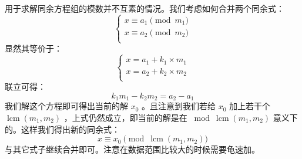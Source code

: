 用于求解同余方程组的模数并不互素的情况。我们考虑如何合并两个同余式：
$$
\begin{cases}
	x \equiv a_1 \pmod {m_1}\\
	x \equiv a_2 \pmod {m_2}\\
\end{cases}
$$
显然其等价于：
$$
\begin{cases}
	x = a_1 + k_1\times m_1\\
	x = a_2 + k_2\times m_2\\
\end{cases}
$$
联立可得：
$$
k_1m_1-k_2m_2=a_2-a_1
$$
我们解这个方程即可得出当前的解 $x_0$ 。且注意到我们若给 $x_0$ 加上若干个 $\operatorname{lcm}(m_1,m_2)$ ，上式仍然成立，即当前的解是在 $\bmod \operatorname{lcm}(m_1,m_2)$ 意义下的。这样我们得出新的同余式：
$$
x\equiv x_0 \pmod {\operatorname{lcm}(m_1,m_2)}
$$
与其它式子继续合并即可。注意在数据范围比较大的时候需要龟速加。